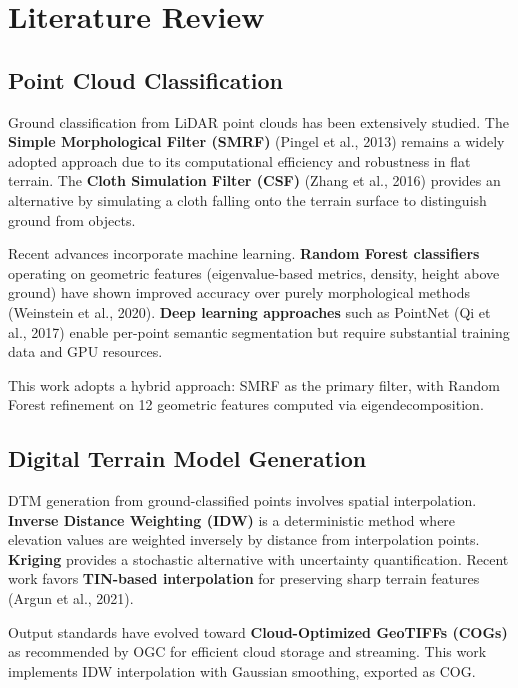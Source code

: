 \documentclass[a4paper,12pt]{article}
\begin{document}
\newpage

\section{Literature Review}

\subsection{Point Cloud Classification}

Ground classification from LiDAR point clouds has been extensively studied. The \textbf{Simple Morphological Filter (SMRF)} (Pingel et al., 2013) remains a widely adopted approach due to its computational efficiency and robustness in flat terrain. The \textbf{Cloth Simulation Filter (CSF)} (Zhang et al., 2016) provides an alternative by simulating a cloth falling onto the terrain surface to distinguish ground from objects.

Recent advances incorporate machine learning. \textbf{Random Forest classifiers} operating on geometric features (eigenvalue-based metrics, density, height above ground) have shown improved accuracy over purely morphological methods (Weinstein et al., 2020). \textbf{Deep learning approaches} such as PointNet (Qi et al., 2017) enable per-point semantic segmentation but require substantial training data and GPU resources.

This work adopts a hybrid approach: SMRF as the primary filter, with Random Forest refinement on 12 geometric features computed via eigendecomposition.

\subsection{Digital Terrain Model Generation}

DTM generation from ground-classified points involves spatial interpolation. \textbf{Inverse Distance Weighting (IDW)} is a deterministic method where elevation values are weighted inversely by distance from interpolation points. \textbf{Kriging} provides a stochastic alternative with uncertainty quantification. Recent work favors \textbf{TIN-based interpolation} for preserving sharp terrain features (Argun et al., 2021).

Output standards have evolved toward \textbf{Cloud-Optimized GeoTIFFs (COGs)} as recommended by OGC for efficient cloud storage and streaming. This work implements IDW interpolation with Gaussian smoothing, exported as COG.
\end{document}
